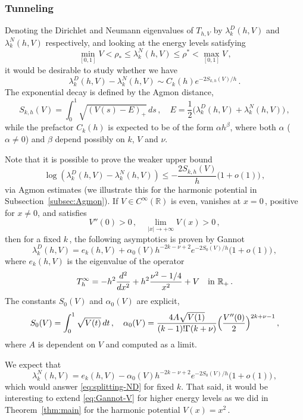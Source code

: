 \documentclass[11pt]{amsart}
\numberwithin{equation}{section}
\theoremstyle{remark}
\newcommand{\R}{\mathbb{R}}
\begin{document}
\subsubsection{Tunneling} Denoting the  Dirichlet and Neumann eigenvalues of $T_{h,V}$ by $\lambda_k^D(h,V)$ and $\lambda_k^N(h,V)$ respectively, and looking at the energy levels satisfying
%
\[\min_{[0,1]} V<\rho_* \leq \lambda_k^N(h,V)\leq \rho^*<\max_{[0,1]}V\,,\] 
it would be desirable to study whether we have
\begin{equation}\label{eq:splitting-ND}\lambda_k^D(h,V)-\lambda_k^N(h,V)\sim C_k(h)e^{-2S_{k,h}(V)/h}\,.
\end{equation}
%
The exponential decay is defined by the Agmon distance,
\[S_{k,h}(V)=\int_0^1\sqrt{(V(s)-E)_+}\,ds\,, \quad E=\frac 12 \bigl(\lambda_k^D(h,V)+\lambda_k^N(h,V)\bigr)\,,\]
%
while the prefactor $C_k(h)$ is expected to be of the form $\alpha h^{\beta}$, where both $\alpha$ ($\alpha\neq 0$) and $\beta$ depend possibly on $k$, $V$ and $\nu$. 

Note that it is possible to prove the weaker upper bound
\[\log (\lambda_k^D(h,V)-\lambda_k^N(h,V))\leq -\frac{2S_{k,h}(V)}{h}\bigl(1+o(1)\bigr)\,,\]
via  Agmon estimates (we illustrate this for the harmonic potential in Subsection~\ref{subsec:Agmon}).
%
If $V\in C^\infty(\R)$ is even, vanishes at $x=0\,$, positive for $x\not=0$, and satisfies
\[ V''(0)>0\,,\quad \lim_{|x|\to+\infty}V(x)>0\,,\]
then for a fixed $k$\,, the following asymptotics is proven by Gannot \cite[Theorem~2]{Gannot}
\begin{equation}\label{eq:Gannot-V}\lambda_k^D(h,V)=e_k(h,V)+\alpha_0(V) h^{-2k-\nu+2}e^{-2S_0(V)/h}\bigl(1+o(1)\bigr)\,,\end{equation}
where $e_k(h,V)$ is the eigenvalue of the operator
\[T_h^\infty=-h^2\frac{d^2}{dx^2}+h^2\frac{\nu^2-1/4}{x^2}+V\quad\text{in $\R_+$\,.}\]
The constants $S_0(V)$ and $\alpha_0(V)$ are explicit,
\[S_0(V)=\int_0^1\sqrt{V(t)}\,dt\,,\quad \alpha_0(V)=\frac{4 A\sqrt{V(1)}}{(k-1)!\Gamma(k+\nu)}\Bigl(\frac{V''(0)}{2}\Bigr)^{2k+\nu-1}\,,\]
where $A$ is dependent on $V$ and computed as a limit. 

We expect that 
\[\lambda_k^N(h,V)=e_k(h,V)-\alpha_0(V) h^{-2k-\nu+2}e^{-2S_0(V)/h}\bigl(1+o(1)\bigr)\,,\]
which would answer \eqref{eq:splitting-ND} for fixed $k$. That said, it would be interesting to extend \eqref{eq:Gannot-V} for higher energy levels as we did in Theorem~\ref{thm:main} for the harmonic potential $V(x)=x^2\,$.
\end{document}
